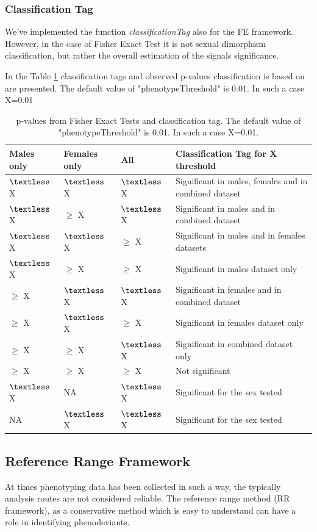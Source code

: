 \documentclass[12pt,a4paper]{article}
\begin{document}
\subsubsection{Classification Tag}
We've implemented the function \textit{classificationTag} also for the FE framework. 
However, in the case of Fisher Exact Test it is not sexual dimorphism classification, but rather the overall estimation of the signals significance.

In the Table \ref{table:06} classification tags and observed p-values classification is based on are presented.  The default value of "phenotypeThreshold" is 0.01. In such a case X=0.01

\begin{table}[!h]
\begin{center}
\begin{tabular}{| l | l | l | p{8cm} |}
  \hline
Males only&Females only&All&Classification Tag for X threshold\\\hline
$\textless$ X&$\textless$ X &$\textless$ X&Significant in males, females and in combined dataset\\
$\textless$ X&$\geq$ X&$\textless$ X&Significant in males and in combined dataset\\
$\textless$ X&$\textless$ X&$\geq$ X&Significant in males and in females datasets\\
$\textless$ X&$\geq$ X&$\geq$ X&Significant in males dataset only\\
$\geq$ X&$\textless$ X&$\textless$ X&Significant in females and in combined dataset\\
$\geq$ X&$\textless$ X&$\geq$ X&Significant in females dataset only\\
$\geq$ X&$\geq$ X&$\textless$ X&Significant in combined dataset only\\
$\geq$ X&$\geq$ X&$\geq$ X&Not significant\\
$\textless$ X&NA&$\textless$ X&Significant for the sex tested\\
NA&$\textless$ X&$\textless$ X&Significant for the sex tested\\

\hline  
\end{tabular}
\caption{p-values from Fisher Exact Tests and classification tag. The default value of "phenotypeThreshold" is 0.01. In such a case X=0.01.}\label{table:06}
\end{center}
\end{table}

\subsection{Reference Range Framework}
At times phenotyping data has been collected in such a way, the typically analysis routes are not considered reliable. The reference range method (RR framework), as a conservative method which is easy to understand can have a role in identifying phenodeviants.   
\end{document}

